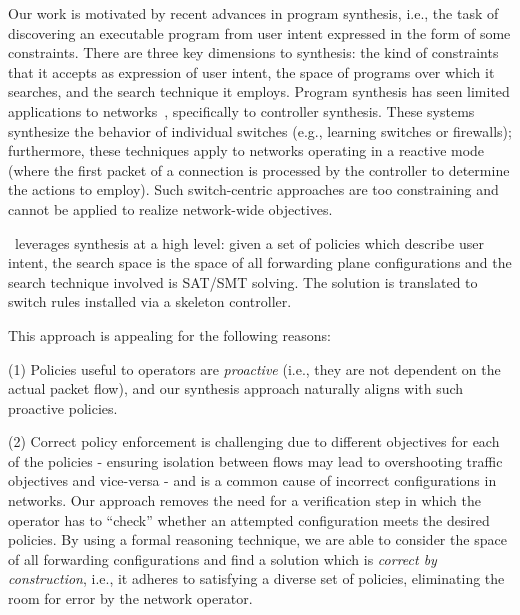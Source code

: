   Our work is motivated by recent advances in program synthesis, i.e.,
  the task of discovering an executable program from user intent
  expressed in the form of some constraints. There are three key
  dimensions to synthesis: the kind of constraints that it accepts as
  expression of user intent, the space of programs over which it
  searches, and the search technique it employs. Program synthesis has
  seen limited applications to networks~\cite{netegg,decentralize},
  specifically to controller synthesis. These systems synthesize the
  behavior of individual switches (e.g., learning switches or
  firewalls); furthermore, these techniques apply to networks
  operating in a reactive mode (where the first packet of a connection
  is processed by the controller to determine the actions to
  employ). Such switch-centric approaches are too constraining and
  cannot be applied to realize network-wide objectives.

\Name\ leverages synthesis at a high level: given a set of
policies which describe user intent, the search space is the space of
all forwarding plane configurations and the search technique involved
is SAT/SMT solving. The solution is translated to switch rules installed via a skeleton controller.

This approach is appealing for the following reasons: 

(1)
Policies useful to operators are \emph{proactive} (i.e., they are not
dependent on the actual packet flow), and our synthesis approach
naturally aligns with such proactive policies.


(2) Correct policy enforcement is challenging due to different
objectives for each of the policies - ensuring isolation between flows
may lead to overshooting traffic objectives and vice-versa - and is a common
cause of incorrect configurations in networks.  Our approach removes
the need for a verification step in which the operator has to
``check'' whether an attempted configuration meets the desired
policies.  By using a formal reasoning technique, we are able to
consider the space of all forwarding configurations and find a
solution which is \emph{correct by construction}, i.e., it adheres to
satisfying a diverse set of policies, eliminating the room for error
by the network operator.

